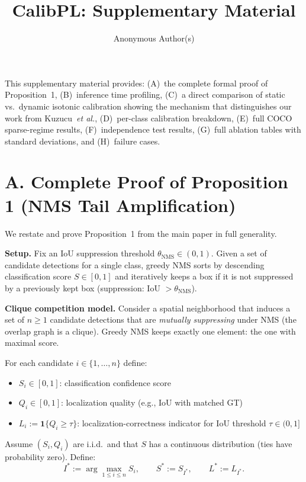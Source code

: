 \documentclass[10pt,twocolumn,letterpaper]{article}
\title{CalibPL: Supplementary Material}
\author{Anonymous Author(s)}
\def\etal{\emph{et al.}}
\begin{document}
\maketitle

This supplementary material provides: (A)~the complete formal proof of
Proposition~1, (B)~inference time profiling, (C)~a direct comparison of static
vs.\ dynamic isotonic calibration showing the mechanism that distinguishes our
work from Kuzucu~\etal, (D)~per-class calibration breakdown, (E)~full
COCO sparse-regime results, (F)~independence test results,
(G)~full ablation tables with standard deviations, and (H)~failure cases.

\section*{A. Complete Proof of Proposition 1 (NMS Tail Amplification)}
\label{sec:proof}

We restate and prove Proposition~1 from the main paper in full generality.

\textbf{Setup.}
Fix an IoU suppression threshold $\theta_\text{NMS}\in(0,1)$. Given a set of
candidate detections for a single class, greedy NMS sorts by descending
classification score $S\in[0,1]$ and iteratively keeps a box if it is not
suppressed by a previously kept box (suppression: IoU $>\theta_\text{NMS}$).

\textbf{Clique competition model.}
Consider a spatial neighborhood that induces a set of $n\ge1$ candidate
detections that are \emph{mutually suppressing} under NMS (the overlap graph is
a clique). Greedy NMS keeps exactly one element: the one with maximal score.

For each candidate $i\in\{1,\dots,n\}$ define:
\begin{itemize}[noitemsep]
  \item $S_i\in[0,1]$: classification confidence score
  \item $Q_i\in[0,1]$: localization quality (e.g., IoU with matched GT)
  \item $L_i := \mathbf{1}\{Q_i \ge \tau\}$: localization-correctness indicator
        for IoU threshold $\tau\in(0,1]$
\end{itemize}

Assume $(S_i, Q_i)$ are i.i.d.\ and that $S$ has a continuous distribution
(ties have probability zero). Define:
\[
I^* := \arg\max_{1\le i\le n} S_i, \qquad S^* := S_{I^*}, \qquad L^* := L_{I^*}.
\]
\end{document}
